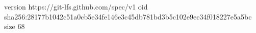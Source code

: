 version https://git-lfs.github.com/spec/v1
oid sha256:28177b1042c51a0cb5e34fe146e3c45db781bd3b5c102e9ec34f018227e5a5bc
size 68
